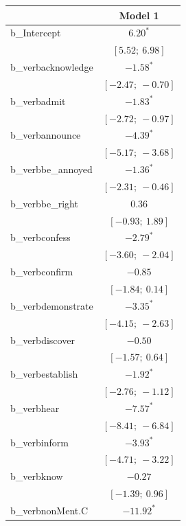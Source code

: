 \documentclass[11pt,fleqn]{article}
\newcommand{\6}{\mbox{$[\hspace*{-.6mm}[$}}
\newcommand{\9}{\mbox{$]\hspace*{-.6mm}]$}}
\begin{document}
{\begin{table}
\begin{center}
\begin{tabular}{l c }
\hline
 & Model 1 \\
\hline
b\_Intercept       & $6.20^{*}$          \\
                   & $[5.52;\ 6.98]$     \\
b\_verbacknowledge & $-1.58^{*}$         \\
                   & $[-2.47;\ -0.70]$   \\
b\_verbadmit       & $-1.83^{*}$         \\
                   & $[-2.72;\ -0.97]$   \\
b\_verbannounce    & $-4.39^{*}$         \\
                   & $[-5.17;\ -3.68]$   \\
b\_verbbe\_annoyed & $-1.36^{*}$         \\
                   & $[-2.31;\ -0.46]$   \\
b\_verbbe\_right   & $0.36$              \\
                   & $[-0.93;\ 1.89]$    \\
b\_verbconfess     & $-2.79^{*}$         \\
                   & $[-3.60;\ -2.04]$   \\
b\_verbconfirm     & $-0.85$             \\
                   & $[-1.84;\ 0.14]$    \\
b\_verbdemonstrate & $-3.35^{*}$         \\
                   & $[-4.15;\ -2.63]$   \\
b\_verbdiscover    & $-0.50$             \\
                   & $[-1.57;\ 0.64]$    \\
b\_verbestablish   & $-1.92^{*}$         \\
                   & $[-2.76;\ -1.12]$   \\
b\_verbhear        & $-7.57^{*}$         \\
                   & $[-8.41;\ -6.84]$   \\
b\_verbinform      & $-3.93^{*}$         \\
                   & $[-4.71;\ -3.22]$   \\
b\_verbknow        & $-0.27$             \\
                   & $[-1.39;\ 0.96]$    \\
b\_verbnonMent.C   & $-11.92^{*}$        \\

\end{tabular}
\end{center}
\end{table}}
\end{document}
